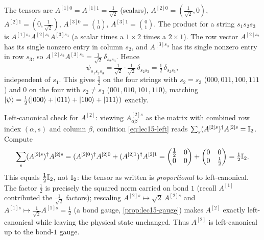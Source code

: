 \begin{solution}
The tensors are $A^{[1]0}=A^{[1]1}=\tfrac1{\sqrt2}$ (scalars),
$A^{[2]0}=(\tfrac1{\sqrt2},0)$, $A^{[2]1}=(0,\tfrac1{\sqrt2})$,
$A^{[3]0}=\binom{1}{0}$, $A^{[3]1}=\binom{0}{1}$. The product for a string
$s_1s_2s_3$ is $A^{[1]s_1}A^{[2]s_2}A^{[3]s_3}$ (a scalar times a $1\times2$ times
a $2\times1$). The row vector $A^{[2]s_2}$ has its single nonzero entry in column
$s_2$, and $A^{[3]s_3}$ has its single nonzero entry in row $s_3$, so
$A^{[2]s_2}A^{[3]s_3}=\tfrac1{\sqrt2}\,\delta_{s_2 s_3}$. Hence
\[
  \psi_{s_1 s_2 s_3}=\tfrac1{\sqrt2}\cdot\tfrac1{\sqrt2}\,\delta_{s_2 s_3}
    =\tfrac12\,\delta_{s_2 s_3},
\]
independent of $s_1$. This gives $\tfrac12$ on the four strings with $s_2=s_3$
($000,011,100,111$) and $0$ on the four with $s_2\neq s_3$ ($001,010,101,110$),
matching $\ket{\psi}=\tfrac12(\ket{000}+\ket{011}+\ket{100}+\ket{111})$ exactly.

Left-canonical check for $A^{[2]}$: viewing $A^{[2]s}_{\alpha\beta}$ as the matrix
with combined row index $(\alpha,s)$ and column $\beta$, condition
\eqref{eq:lec15-left} reads $\sum_s (A^{[2]s})^{\dagger} A^{[2]s}=\mathbb{I}_2$. Compute
\[
  \sum_{s}(A^{[2]s})^{\dagger} A^{[2]s}
   =(A^{[2]0})^{\dagger} A^{[2]0}+(A^{[2]1})^{\dagger} A^{[2]1}
   =\begin{pmatrix}\tfrac12&0\\0&0\end{pmatrix}
    +\begin{pmatrix}0&0\\0&\tfrac12\end{pmatrix}
   =\tfrac12\mathbb{I}_2 .
\]
This equals $\tfrac12\mathbb{I}_2$, not $\mathbb{I}_2$: the tensor as written is
\emph{proportional} to left-canonical. The factor $\tfrac12$ is precisely the
squared norm carried on bond $1$ (recall $A^{[1]}$ contributed the
$\tfrac1{\sqrt2}$ factors); rescaling $A^{[2]s}\mapsto\sqrt2\,A^{[2]s}$ and
$A^{[1]s}\mapsto\tfrac1{\sqrt2}A^{[1]s}=\tfrac12$ (a bond gauge,
\cref{prop:lec15-gauge}) makes $A^{[2]}$ exactly left-canonical while leaving the
physical state unchanged. Thus $A^{[2]}$ is left-canonical up to the bond-$1$ gauge.
\end{solution}

